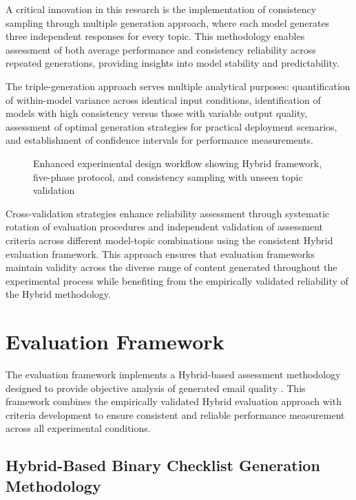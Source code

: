 A critical innovation in this research is the implementation of consistency sampling through multiple generation approach, where each model generates three independent responses for every topic. This methodology enables assessment of both average performance and consistency reliability across repeated generations, providing insights into model stability and predictability.

The triple-generation approach serves multiple analytical purposes: quantification of within-model variance across identical input conditions, identification of models with high consistency versus those with variable output quality, assessment of optimal generation strategies for practical deployment scenarios, and establishment of confidence intervals for performance measurements.

\begin{figure}[htbp]
    \centering
    \caption{Enhanced experimental design workflow showing Hybrid framework, five-phase protocol, and consistency sampling with unseen topic validation}
    \label{fig:experimental-design}
\end{figure}

Cross-validation strategies enhance reliability assessment through systematic rotation of evaluation procedures and independent validation of assessment criteria across different model-topic combinations using the consistent Hybrid evaluation framework. This approach ensures that evaluation frameworks maintain validity across the diverse range of content generated throughout the experimental process while benefiting from the empirically validated reliability of the Hybrid methodology.

\section{Evaluation Framework}
\label{sec:evaluation-framework}

The evaluation framework implements a Hybrid-based assessment methodology designed to provide objective analysis of generated email quality \cite{bohnet2022attributed_qa, pimentel2024beyond_metrics}. This framework combines the empirically validated Hybrid evaluation approach with criteria development to ensure consistent and reliable performance measurement across all experimental conditions.

\subsection{Hybrid-Based Binary Checklist Generation Methodology}

